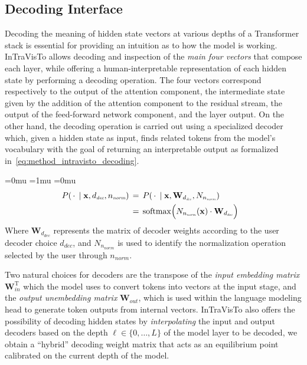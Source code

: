 \documentclass[11pt,a4paper,twocolumn]{article}
\newcommand{\gbm}[1]{\bm{\mathbf{#1}}} %
\renewcommand{\T}{\mathrm{T}} %
\begin{document}
\subsection{Decoding Interface}\label{ssec:intravisto_1}

Decoding the meaning of hidden state vectors at various depths of a Transformer stack is essential for providing an intuition as to how the model is working.
InTraVisTo allows decoding and inspection of the \emph{main four vectors} that compose each layer, while offering a human-interpretable representation of each hidden state by performing a decoding operation.
The four vectors correspond respectively to the output of the attention component, the intermediate state given by the addition of the attention component to the residual stream, the output of the feed-forward network component, and the layer output.
On the other hand, the decoding operation is carried out using a specialized decoder which, given a hidden state as input, finds related tokens from the model's vocabulary with the goal of returning an interpretable output as formalized in~\cref{eq:method_intravisto_decoding}.

\vspace{-12pt}
{
\medmuskip=0mu
\thinmuskip=1mu
\thickmuskip=0mu
\scriptspace=0pt
\begin{equation}
\label{eq:method_intravisto_decoding}
\hspace{-10pt}
\begin{aligned}
P(\,\cdot\,\mid \gbm{x}, d_\textit{\scalebox{.8}{dec}}, n_\textit{\scalebox{.8}{norm}}) \,&=\, P(\,\cdot\,\mid \gbm{x}, \gbm{W}_{d_\textit{\scalebox{.8}{dec}}}, N_{n_\textit{\scalebox{.8}{norm}}}) \\
&=\,\operatorname{softmax}\Bigl(N_{n_\textit{\scalebox{.8}{norm}}}(\gbm{x}) \cdot \gbm{W}_{d_\textit{\scalebox{.8}{dec}}}\Bigr)
\end{aligned}
\end{equation}
}%
\noindent Where $\gbm{W}_{d_\textit{dec}}$ represents the matrix of decoder weights according to the user decoder choice $d_\textit{dec}$, and $N_{n_\textit{norm}}$ is used to identify the normalization operation selected by the user through $n_\textit{norm}$.

Two natural choices for decoders are the transpose of the \emph{input embedding matrix} $\gbm{W}_\textit{in}^\T$ which the model uses to convert tokens into vectors at the input stage, and the \emph{output unembedding matrix} $\gbm{W}_\textit{out}$, which is used within the language modeling head to generate token outputs from internal vectors.
InTraVisTo also offers the possibility of decoding hidden states by \emph{interpolating} the input and output decoders based on the depth $\ell\in\{0,\ldots,L\}$ of the model layer to be decoded, we obtain a ``hybrid'' decoding weight matrix that acts as an equilibrium point calibrated on the current depth of the model.
\end{document}
